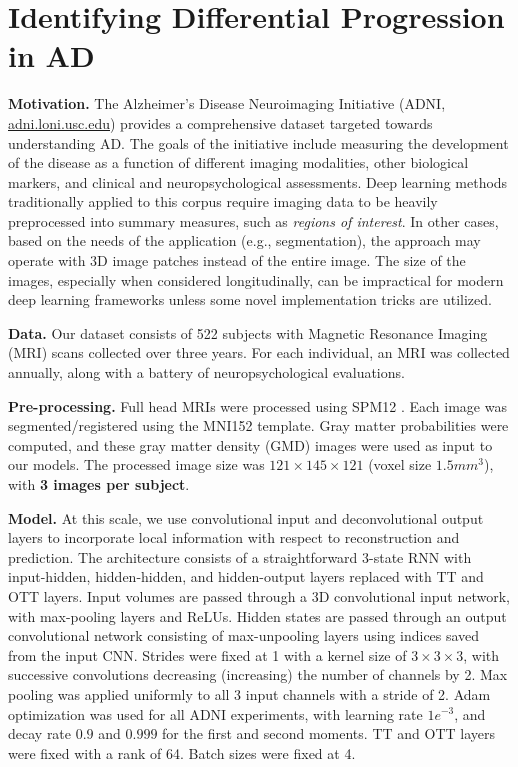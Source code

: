 \section{Identifying Differential Progression in AD}\label{sec:adni}
        {\bf Motivation.} The Alzheimer's Disease Neuroimaging Initiative (ADNI, \url{adni.loni.usc.edu})  provides a comprehensive dataset
        targeted towards understanding AD. The goals of the initiative include measuring the development of the disease as a function of different imaging modalities, other biological markers, and clinical and neuropsychological assessments. 
Deep learning methods traditionally applied to this corpus require imaging data to be heavily preprocessed into summary measures, such as \textit{regions of interest}.
  In other cases, based on the needs of the application (e.g., segmentation),
the approach may operate with 3D image patches instead of the entire image. 
The size of the images, especially when considered longitudinally, can be impractical for modern deep learning frameworks unless some novel
implementation tricks are utilized. 

\textbf{Data.} Our dataset consists of 522 subjects with Magnetic Resonance Imaging (MRI) scans collected over three years. For each individual, an MRI was collected annually, along with a battery of neuropsychological evaluations.

{\bf Pre-processing.}
Full head MRIs were processed using SPM12 \cite{ashburner2014spm12}. Each image was segmented/registered using the MNI152 template. Gray matter probabilities were computed, and these gray matter density (GMD) images were used as input to our models.
The processed image size was $121 \times 145 \times 121$ (voxel size $1.5mm^3$), with {\bf 3 images per subject}.

\textbf{Model.} At this scale, we use convolutional input and deconvolutional output layers to incorporate local information with respect to reconstruction and prediction. The architecture consists of a straightforward 3-state RNN with input-hidden, hidden-hidden, and hidden-output layers replaced with TT and OTT layers. Input volumes are passed through a 3D convolutional input network, with max-pooling layers and ReLUs.
Hidden states are passed through an output convolutional network consisting of max-unpooling layers using indices
saved from the input CNN.
Strides were fixed at 1 with a kernel size of $3\times 3 \times 3$,
with successive convolutions decreasing (increasing) the number of channels by 2.
Max pooling was applied uniformly to all 3 input channels with a stride of 2. Adam optimization \cite{kingma2014adam} was used for all
ADNI experiments, with learning rate $1e^{-3}$, and decay rate $0.9$ and $0.999$ for the first and second moments. TT and OTT layers were fixed with a rank of 64. Batch sizes were fixed at 4.


